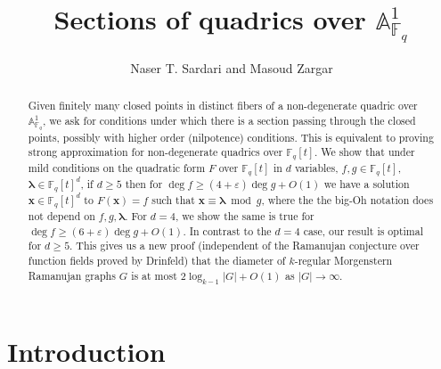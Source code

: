 \documentclass[11pt]{amsart}
\theoremstyle{plain}
\theoremstyle{plain}
\renewcommand{\vec}[1]{\mathbf{#1}}
\theoremstyle{remark}
\theoremstyle{definition}
\renewcommand{\contentsname}{}
\begin{document}
\title{Sections of quadrics over $\mathbb{A}^1_{\mathbb{F}_q}$}
\author{Naser T. Sardari and Masoud Zargar}

\address{Department of Mathematics, UW-Madison, Madison, WI 53706}

\address{Department of Mathematics, University of Regensburg, Regensburg, Germany}


\renewcommand{\contentsname}{}

\begin{abstract}
Given finitely many closed points in distinct fibers of a non-degenerate quadric over $\mathbb{A}^1_{\mathbb{F}_q}$, we ask for conditions under which there is a section passing through the closed points, possibly with higher order (nilpotence) conditions. This is equivalent to proving strong approximation for non-degenerate quadrics over $\mathbb{F}_q[t]$.  We show that under mild conditions on the quadratic form $F$ over $\mathbb{F}_q[t]$ in $d$ variables, $f,g\in\mathbb{F}_q[t]$, $\boldsymbol{\lambda}\in\mathbb{F}_q[t]^d$, if $d\geq 5$ then for $\deg f\geq (4+\varepsilon)\deg g+O(1)$ we have a solution $\vec{x}\in\mathbb{F}_q[t]^d$ to $F(\vec{x})=f$ such that $\vec{x}\equiv\boldsymbol{\lambda}\bmod g$, where the the big-Oh notation does not depend on $f,g,\boldsymbol{\lambda}$. For $d=4$, we show the same is true for $\deg f\geq (6+\varepsilon)\deg g+O(1)$. In contrast to the $d=4$ case, our result is optimal for $d\geq 5$. This gives us a new proof (independent of the Ramanujan conjecture over function fields proved by Drinfeld) that the diameter of $k$-regular Morgenstern Ramanujan graphs $G$ is at most $2\log_{k-1}|G|+O(1)$ as $|G|\rightarrow\infty$. \footnotetext{\date\today}
\end{abstract}
\maketitle
\setcounter{tocdepth}{1}
\tableofcontents
\section{Introduction}\label{intro}
\end{document}
